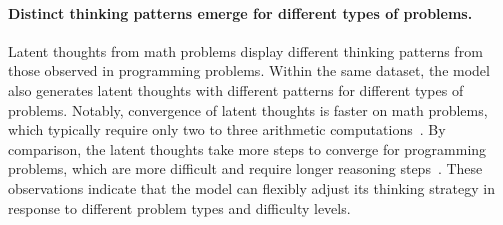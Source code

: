 \documentclass{article} %
\begin{document}
\paragraph*{Distinct thinking patterns emerge for different types of problems.}
\vspace{-0.1cm}
Latent thoughts from math problems display different thinking patterns from those observed in programming problems. 
%
Within the same dataset, the model also generates latent thoughts with different patterns for different types of problems. 
%
Notably,
convergence of latent thoughts is faster on math problems, which typically require only two to three arithmetic computations~\citep{patel2021nlp}. By comparison, the latent thoughts take more steps to converge for programming problems, which are more difficult and require longer reasoning steps~\citep{austin2021program}. 
%
These observations indicate that the model can flexibly adjust its thinking strategy in response to different problem types and difficulty levels.
\end{document}
